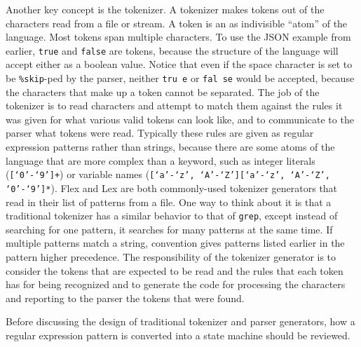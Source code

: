 {	Another key concept is the tokenizer. A tokenizer makes tokens out of
		the characters read from a file or stream.
		A token is an as indivisible ``atom'' of
		the language. Most tokens span multiple characters.
		To use the JSON example from earlier, \texttt{true}
		and \texttt{false} are tokens, because the structure of the language
		will accept either as a boolean value. Notice that even if
		the space character is set to be \texttt{\%skip}-ped by the parser,
		neither \texttt{tru e} or \texttt{fal se} would be accepted, because
		the characters that make up a token cannot be separated. The job of the
		tokenizer is to read characters and
		attempt to match them against the rules it was given for what various
		valid tokens can look like, and to communicate to the parser what
		tokens were read.
		Typically these rules are given as regular expression patterns rather
		than strings, because there are some atoms of the language that
		are more complex than a keyword, such as integer
		literals (\texttt{[`0'-`9']+}) or variable
		names (\texttt{[`a'-`z', `A'-`Z'][`a'-`z', `A'-`Z', `0'-`9']*}).
		Flex and Lex are both commonly-used
		tokenizer generators that read in their list of patterns from a file.
		One way to think about it is that a
		traditional tokenizer has a similar behavior
		to that of \texttt{grep}, except instead of searching for one pattern, it
		searches for many patterns at the same time.
		If multiple patterns match a string, convention gives patterns listed
		earlier in the pattern higher precedence.
		The responsibility of
		the tokenizer generator is to consider the tokens that
		are expected to be read and the rules that each token has for being
		recognized and to generate the code for processing the characters
		and reporting to the parser the tokens that were found.
	
	Before discussing the design of traditional
		tokenizer and parser generators, how a regular expression
		pattern is converted into a state machine should be reviewed.
	
}
